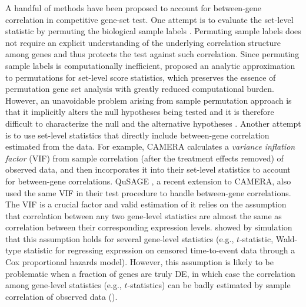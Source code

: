 	A handful of methods have been proposed to account for between-gene correlation in competitive 
	gene-set test. One attempt is to evaluate the set-level statistic by permuting the biological 
	sample labels \citep{efron2007testing,subramanian2005gene}. Permuting sample labels
	does not require an explicit understanding of the underlying correlation structure among genes 
	and thus protects the test against such correlation. Since permuting sample labels is 
	computationally	inefficient, \citet{zhou2013empirical} proposed an analytic approximation to 
	permutations for set-level score statistics, which preserves the essence of permutation gene 
	set analysis with greatly reduced computational burden. However, an unavoidable problem arising 
	from sample	permutation approach is that it implicitly alters the null hypotheses being 
	tested and it is therefore difficult to characterize the null and the alternative hypotheses
	\citep{goeman2007analyzing, khatri2012ten, wu2012camera}. Another attempt is to use set-level
	statistics that directly include between-gene correlation estimated from the data. For example, 
	CAMERA \citep{wu2012camera} calculates a \textit{variance inflation factor} (VIF) from sample 
	correlation (after the treatment effects removed) of observed data, and then incorporates it 
	into their set-level statistics to account for between-gene correlations. QuSAGE 
	\citep{yaari2013quantitative}, a recent
	extension to CAMERA, also used the same VIF in their test procedure to handle between-gene 
	correlations. The VIF is a crucial factor and valid estimation of it
	relies on the assumption that correlation between any two gene-level statistics are almost the 
	same as correlation between their corresponding expression levels. \citet{barry2008statistical} 
	showed by simulation that this assumption holds for several gene-level statistics
	(e.g., $t$-statistic, Wald-type statistic for regressing expression on censored time-to-event 
	data through a Cox proportional hazards model). However, this assumption is likely to be 
	problematic when a fraction of genes are  truly DE, in which case the correlation among 
	gene-level	statistics (e.g., $t$-statistics) can be badly estimated by sample correlation of 
	observed data (\thepapertobefinished). 
	
